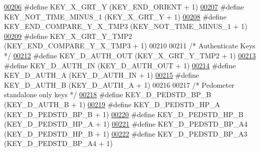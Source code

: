 \begin{DoxyCode}
\hypertarget{dmp_key_8h_source.tex_l00206}{}\hyperlink{dmp_key_8h_a83a4c32ff31709bd76843a480e04ff3a}{00206} \textcolor{preprocessor}{#define KEY\_X\_GRT\_Y                 (KEY\_END\_ORIENT + 1)}
\hypertarget{dmp_key_8h_source.tex_l00207}{}\hyperlink{dmp_key_8h_ab1bf47800a1876cde2b38ed43380180e}{00207} \textcolor{preprocessor}{#define KEY\_NOT\_TIME\_MINUS\_1        (KEY\_X\_GRT\_Y + 1)       }
\hypertarget{dmp_key_8h_source.tex_l00208}{}\hyperlink{dmp_key_8h_a7e19d54f40e69e66c4c6f5d07bd9a3ff}{00208} \textcolor{preprocessor}{#define KEY\_END\_COMPARE\_Y\_X\_TMP3    (KEY\_NOT\_TIME\_MINUS\_1 + 1) }
\hypertarget{dmp_key_8h_source.tex_l00209}{}\hyperlink{dmp_key_8h_a4a328a8ff13b50c160f74d3c2598d329}{00209} \textcolor{preprocessor}{#define KEY\_X\_GRT\_Y\_TMP2            (KEY\_END\_COMPARE\_Y\_X\_TMP3 + 1)}
00210 
00211 \textcolor{comment}{/* Authenticate Keys */}
\hypertarget{dmp_key_8h_source.tex_l00212}{}\hyperlink{dmp_key_8h_a4c29ca8efec08f8a64600e8aa5a32c12}{00212} \textcolor{preprocessor}{#define KEY\_D\_AUTH\_OUT              (KEY\_X\_GRT\_Y\_TMP2 + 1)}
\hypertarget{dmp_key_8h_source.tex_l00213}{}\hyperlink{dmp_key_8h_a59e847b64e33e61f9966b3d983b10b15}{00213} \textcolor{preprocessor}{#define KEY\_D\_AUTH\_IN               (KEY\_D\_AUTH\_OUT + 1)}
\hypertarget{dmp_key_8h_source.tex_l00214}{}\hyperlink{dmp_key_8h_a92d1d618492b7328916f55b8f7abea3c}{00214} \textcolor{preprocessor}{#define KEY\_D\_AUTH\_A                (KEY\_D\_AUTH\_IN + 1)}
\hypertarget{dmp_key_8h_source.tex_l00215}{}\hyperlink{dmp_key_8h_a70e9d248e43cdfa63d3831f7f82f9b93}{00215} \textcolor{preprocessor}{#define KEY\_D\_AUTH\_B                (KEY\_D\_AUTH\_A + 1)}
00216 
00217 \textcolor{comment}{/* Pedometer standalone only keys */}
\hypertarget{dmp_key_8h_source.tex_l00218}{}\hyperlink{dmp_key_8h_a8f8b3b0a8943bd307b1dec4bd72359f8}{00218} \textcolor{preprocessor}{#define KEY\_D\_PEDSTD\_BP\_B           (KEY\_D\_AUTH\_B + 1)}
\hypertarget{dmp_key_8h_source.tex_l00219}{}\hyperlink{dmp_key_8h_ac990aaace317529e60bae4a8d0488b4a}{00219} \textcolor{preprocessor}{#define KEY\_D\_PEDSTD\_HP\_A           (KEY\_D\_PEDSTD\_BP\_B + 1)}
\hypertarget{dmp_key_8h_source.tex_l00220}{}\hyperlink{dmp_key_8h_a984c0056912d9764a95a8688bc411ba4}{00220} \textcolor{preprocessor}{#define KEY\_D\_PEDSTD\_HP\_B           (KEY\_D\_PEDSTD\_HP\_A + 1)}
\hypertarget{dmp_key_8h_source.tex_l00221}{}\hyperlink{dmp_key_8h_a00642103ec420a4ce4e0ecaccb307e3d}{00221} \textcolor{preprocessor}{#define KEY\_D\_PEDSTD\_BP\_A4          (KEY\_D\_PEDSTD\_HP\_B + 1)}
\hypertarget{dmp_key_8h_source.tex_l00222}{}\hyperlink{dmp_key_8h_a3b6016875ac268e46923fb9e7ce7dd2c}{00222} \textcolor{preprocessor}{#define KEY\_D\_PEDSTD\_BP\_A3          (KEY\_D\_PEDSTD\_BP\_A4 + 1)}

\end{DoxyCode}
